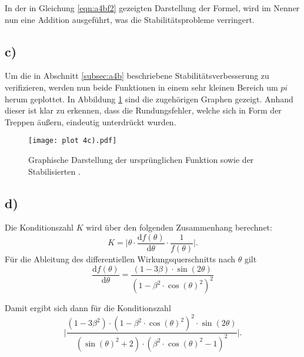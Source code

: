 In der in Gleichung \eqref{eqn:a4bf2} gezeigten Darstellung der Formel, wird im Nenner nun eine Addition ausgeführt, was die Stabilitätsprobleme verringert.

\subsection{c)}
\label{subsec:a4c}
Um die in Abschnitt \ref{subsec:a4b} beschriebene Stabilitätsverbesserung zu verifizieren, werden nun beide Funktionen in einem sehr kleinen Bereich
um $pi$ herum geplottet. In Abbildung \ref{fig:a4A1} sind die zugehörigen Graphen gezeigt. Anhand dieser ist klar zu erkennen, dass die Rundungsfehler,
welche sich in Form der Treppen äußern,
eindeutig unterdrückt wurden.
\\

\FloatBarrier
\begin{figure}
  \centering
  \texttt{[image: plot 4c).pdf]}
  \caption{Graphische Darstellung der ursprünglichen Funktion sowie der Stabilisierten .}
  \label{fig:a4A1}
\end{figure}
\FloatBarrier

\subsection{d)}
Die Konditionszahl $K$ wird über den folgenden Zusammenhang berechnet:
\\
\begin{equation}
  \label{eqn:a4df1}
  K = \lvert \theta \cdot \frac{\text{d}f(\theta)}{\text{d}\theta} \cdot \frac{1}{f(\theta)}\rvert.
\end{equation}
Für die Ableitung des differentiellen Wirkungsquerschnitts nach $\theta$ gilt
\\
\begin{equation}
  \label{eqn:a4df2}
   \frac{\text{d}f(\theta)}{\text{d}\theta} = \frac{\left(1-3\beta\right) \cdot \sin\left( 2\theta \right)}{\left( 1 - \beta^{2} \cdot \cos\left( \theta \right)^{2} \right)^{2}}
\end{equation}

Damit ergibt sich dann für die Konditionszahl
\\
\begin{equation}
  \label{eqn:a4df3}
  \lvert \frac{\left( 1 - 3\beta^{2} \right) \cdot \left( 1 - \beta^{2} \cdot \cos\left( \theta \right)^{2} \right)^{2} \cdot \sin\left( 2\theta \right)}{\left( \sin\left( \theta \right)^{2} + 2\right) \cdot \left( \beta^{2} \cdot \cos\left( \theta \right)^{2} - 1 \right)^{2}} \rvert.
\end{equation}

